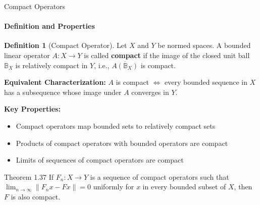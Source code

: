 \documentclass[aspectratio=169,10pt]{beamer}
\theoremstyle{definition}
\newtheorem{defn}{Definition}
\begin{document}
\begin{frame}{Compact Operators}
\framesubtitle{Definition and Properties}

\begin{defn}[Compact Operator]
Let $X$ and $Y$ be normed spaces. A bounded linear operator $A: X \to Y$ is called \textbf{compact} if the image of the closed unit ball $\mathbb{B}_X$ is relatively compact in $Y$, i.e., $\overline{A(\mathbb{B}_X)}$ is compact.
\end{defn}

\vspace{0.3cm}

\textbf{Equivalent Characterization:}
$A$ is compact $\iff$ every bounded sequence in $X$ has a subsequence whose image under $A$ converges in $Y$.

\vspace{0.3cm}

\textbf{Key Properties:}
\begin{itemize}
    \item Compact operators map bounded sets to relatively compact sets
    \item Products of compact operators with bounded operators are compact
    \item Limits of sequences of compact operators are compact
\end{itemize}

\vspace{0.3cm}

\begin{block}{Theorem 1.37}
If $F_n : X \to Y$ is a sequence of compact operators such that $\lim_{n \to \infty} \|F_n x - Fx\| = 0$ uniformly for $x$ in every bounded subset of $X$, then $F$ is also compact.
\end{block}
\end{frame}
\end{document}
